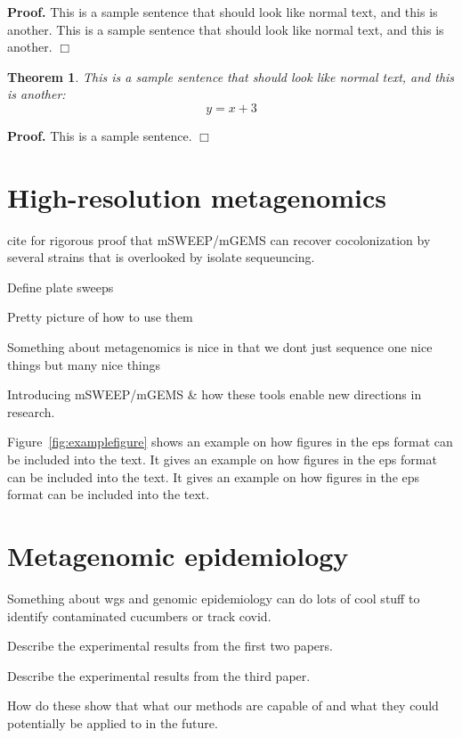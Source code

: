 \documentclass[officiallayout]{tktla}
\newtheorem{theorem}{Theorem}[chapter]
\newenvironment{proof}{\noindent\textbf{Proof.} }{$\Box$}
\begin{document}
\begin{proof}
This is a sample sentence that should look like normal text, and this
is another. This is a sample sentence that should look like normal
text, and this is another.
\end{proof}

\begin{theorem}
This is a sample sentence that should look like normal text,
and this is another:
\[ y = x+3 \]
\end{theorem}

\begin{proof}
This is a sample sentence.
\end{proof}

\chapter{High-resolution metagenomics}

cite \citet{tonkin-hill_pneumococcal_2022} for rigorous proof that
mSWEEP/mGEMS can recover cocolonization by several strains that is
overlooked by isolate sequeuncing.

Define plate sweeps

Pretty picture of how to use them

Something about metagenomics is nice in that we dont just sequence one
nice things but many nice things

Introducing mSWEEP/mGEMS \& how these tools enable new directions in research.

Figure~\ref{fig:examplefigure} shows an example on how figures in the 
eps format can be included into the text. It gives an example on how 
figures in the eps format can be included into the text. It gives 
an example on how figures in the eps format can be included into the text.

\chapter{Metagenomic epidemiology}

Something about wgs and genomic epidemiology can do lots of cool stuff
to identify contaminated cucumbers or track covid.

Describe the experimental results from the first two papers.

Describe the experimental results from the third paper.

How do these show that what our methods are capable of and what they
could potentially be applied to in the future.
\end{document}
